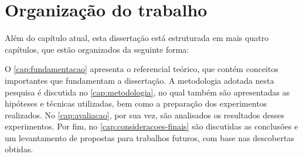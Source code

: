 \section{Organização do trabalho}
\label{sec:introducao-organizacao-trabalho}

Além do capítulo atual, esta dissertação está estruturada em mais quatro capítulos, que estão organizados da seguinte forma:

O \autoref{cap:fundamentacao} apresenta o referencial teórico, que contém conceitos importantes que fundamentam a dissertação.
A metodologia adotada nesta pesquisa é discutida no \autoref{cap:metodologia}, no qual também são apresentadas as hipóteses e técnicas utilizadas, bem como a preparação dos experimentos realizados.
No \autoref{cap:avaliacao}, por sua vez, são analisados os resultados desses experimentos.
Por fim, no \autoref{cap:consideracoes-finais} são discutidas as conclusões e um levantamento de propostas para trabalhos futuros, com base nas descobertas obtidas.
